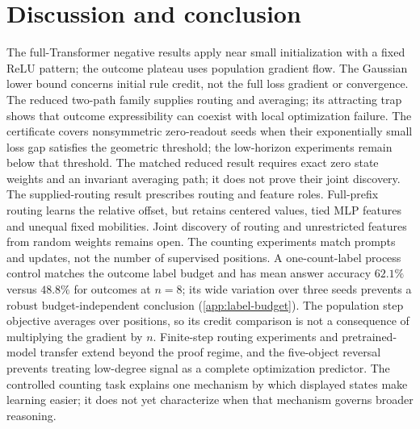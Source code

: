 \section{Discussion and conclusion}
\label{sec:conclusion}
\label{sec:discussion}

The full-Transformer negative results apply near small initialization with a fixed
ReLU pattern; the outcome plateau uses population gradient flow.
The Gaussian lower bound concerns initial rule credit, not the full loss gradient
or convergence. The reduced two-path family supplies routing and averaging;
its attracting trap shows that outcome expressibility can coexist with local
optimization failure. The certificate covers nonsymmetric zero-readout seeds when their exponentially
small loss gap satisfies the geometric threshold; the low-horizon experiments
remain below that threshold. The matched reduced result requires exact zero state
weights and an invariant averaging path; it does not prove their joint discovery.
The supplied-routing result prescribes routing and feature roles. Full-prefix
routing learns the relative offset, but retains centered values, tied MLP features
and unequal fixed mobilities. Joint discovery of routing and unrestricted
features from random weights remains open.
The counting experiments match prompts and updates, not the number of supervised
positions. A one-count-label process control matches the outcome label budget and has mean
answer accuracy $62.1\%$ versus $48.8\%$ for outcomes at $n=8$; its wide variation
over three seeds prevents a robust budget-independent conclusion
(\cref{app:label-budget}). The population step objective averages
over positions, so its credit comparison is not a consequence of multiplying the gradient by $n$.
Finite-step routing experiments and pretrained-model transfer extend beyond the proof regime,
and the five-object reversal prevents treating low-degree signal as a complete optimization
predictor. The controlled counting task explains one mechanism by which displayed states
make learning easier; it does not yet characterize when that mechanism governs broader reasoning.
